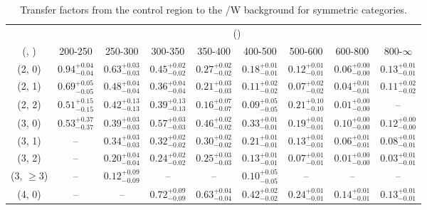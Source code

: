 \begin{table}[h!]
\tiny
\centering
\caption{Transfer factors from the \mj control region to the \ttbar/W background for symmetric categories.\label{tab:tf_mu_ttw_sym}}
\begin{tabular}
{ccccccccc}
	\hline\hline
	& \multicolumn{8}{c}{\scalht (\gev)} \\ 
	 (\njet,  \nb) & 200-250 & 250-300 & 300-350 & 350-400 & 400-500 & 500-600 & 600-800 & 800-$\infty$ \\ [0.8ex] 
\hline
	(2, 0) & $0.94^{+ 0.04 }_{- 0.04 }$ & $0.63^{+ 0.03 }_{- 0.03 }$ & $0.45^{+ 0.02 }_{- 0.02 }$ & $0.27^{+ 0.02 }_{- 0.02 }$ & $0.18^{+ 0.01 }_{- 0.01 }$ & $0.12^{+ 0.01 }_{- 0.01 }$ & $0.06^{+ 0.00 }_{- 0.00 }$ & $0.13^{+ 0.01 }_{- 0.01 }$ \\[0.5ex] 
	(2, 1) & $0.69^{+ 0.05 }_{- 0.05 }$ & $0.48^{+ 0.04 }_{- 0.04 }$ & $0.36^{+ 0.04 }_{- 0.04 }$ & $0.21^{+ 0.03 }_{- 0.03 }$ & $0.11^{+ 0.02 }_{- 0.02 }$ & $0.07^{+ 0.02 }_{- 0.02 }$ & $0.04^{+ 0.01 }_{- 0.01 }$ & $0.11^{+ 0.02 }_{- 0.02 }$ \\[0.5ex] 
	(2, 2) & $0.51^{+ 0.15 }_{- 0.15 }$ & $0.42^{+ 0.13 }_{- 0.13 }$ & $0.39^{+ 0.13 }_{- 0.13 }$ & $0.16^{+ 0.07 }_{- 0.07 }$ & $0.09^{+ 0.05 }_{- 0.05 }$ & $0.21^{+ 0.10 }_{- 0.10 }$ & $0.01^{+ 0.00 }_{- 0.00 }$ & -- \\[0.5ex] 
	(3, 0) & $0.53^{+ 0.37 }_{- 0.37 }$ & $0.39^{+ 0.03 }_{- 0.03 }$ & $0.57^{+ 0.03 }_{- 0.03 }$ & $0.46^{+ 0.02 }_{- 0.02 }$ & $0.33^{+ 0.01 }_{- 0.01 }$ & $0.19^{+ 0.01 }_{- 0.01 }$ & $0.10^{+ 0.00 }_{- 0.00 }$ & $0.12^{+ 0.00 }_{- 0.00 }$ \\[0.5ex] 
	(3, 1) & -- & $0.34^{+ 0.03 }_{- 0.03 }$ & $0.32^{+ 0.02 }_{- 0.02 }$ & $0.30^{+ 0.02 }_{- 0.02 }$ & $0.21^{+ 0.01 }_{- 0.01 }$ & $0.13^{+ 0.01 }_{- 0.01 }$ & $0.06^{+ 0.01 }_{- 0.01 }$ & $0.08^{+ 0.01 }_{- 0.01 }$ \\[0.5ex] 
	(3, 2) & -- & $0.20^{+ 0.04 }_{- 0.04 }$ & $0.24^{+ 0.02 }_{- 0.02 }$ & $0.25^{+ 0.03 }_{- 0.03 }$ & $0.13^{+ 0.01 }_{- 0.01 }$ & $0.07^{+ 0.01 }_{- 0.01 }$ & $0.01^{+ 0.00 }_{- 0.00 }$ & $0.03^{+ 0.01 }_{- 0.01 }$ \\[0.5ex] 
	(3, $\ge3$) & -- & $0.12^{+ 0.09 }_{- 0.09 }$ & -- & -- & $0.10^{+ 0.05 }_{- 0.05 }$ & -- & -- & -- \\[0.5ex] 
	(4, 0) & -- & -- & $0.72^{+ 0.09 }_{- 0.09 }$ & $0.63^{+ 0.04 }_{- 0.04 }$ & $0.42^{+ 0.02 }_{- 0.02 }$ & $0.24^{+ 0.01 }_{- 0.01 }$ & $0.14^{+ 0.01 }_{- 0.01 }$ & $0.13^{+ 0.01 }_{- 0.01 }$ \\[0.5ex] 

\end{tabular}
\end{table}
